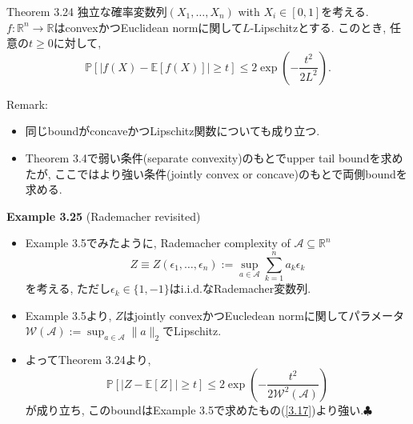 \documentclass[aspectratio=169, dvipdfmx]{beamer}
\def\endexample{\hfill $\clubsuit$}
\newcommand{\ex}{\mathbb{E}}
\newcommand{\bb}{\mathbb}
\newcommand{\cc}{\mathcal}
\begin{document}
\begin{frame}
\begin{block}{Theorem 3.24}
    独立な確率変数列$(X_1, \dots, X_n)$ with $X_i \in [0,1]$を考える.
    $f: \mathbb{R}^n \to \mathbb{R}$はconvexかつEuclidean normに関して$L$-Lipschitzとする.
    このとき, 任意の$t \ge 0$に対して,
    \[
        \bb{P}[|f(X) - \ex[f(X)]| \ge t]
        \le 2 \exp\left(-\frac{t^2}{2L^2}\right).
        \tag{3.74}\label{3.74}
    \]
\end{block}
{Remark}:
\begin{itemize}
    \item 同じboundがconcaveかつLipschitz関数についても成り立つ.
    \item Theorem 3.4で弱い条件(separate convexity)のもとでupper tail boundを求めたが,
        ここではより強い条件(jointly convex or concave)のもとで両側boundを求める.
\end{itemize}
\end{frame}

\begin{frame}{}{}
{\bf Example 3.25} (Rademacher revisited)
\begin{itemize}
    \item Example 3.5でみたように, Rademacher complexity of $\cc{A} \subseteq \bb{R}^n$
    \[ 
        Z \equiv Z(\epsilon_1, \dots, \epsilon_n) := \sup_{a \in \cc{A}}\sum_{k=1}^n a_k \epsilon_k
    \]
    を考える, ただし$\epsilon_k \in \{1, -1\}$はi.i.d.なRademacher変数列.
    \item Example 3.5より,
    $Z$はjointly convexかつEucledean normに関してパラメータ$\cc{W}(\cc{A}) := \sup_{a \in \cc{A}}\|a\|_2$でLipschitz.
    \item よってTheorem 3.24より,
    \[
        \bb{P}[|Z - \ex[Z]| \ge t]
        \le 2 \exp\left(-\frac{t^2}{2 \cc{W}^2(\cc{A})}\right)
        \tag{3.75}\label{3.75}
    \]
    が成り立ち, このboundはExample 3.5で求めたもの(\ref{3.17})より強い.\endexample
\end{itemize}
\end{frame}
\end{document}
